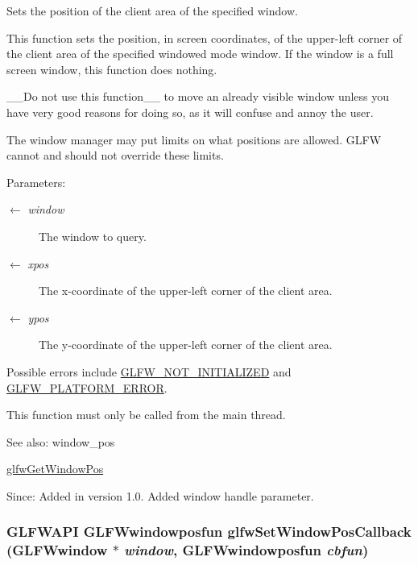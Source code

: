 Sets the position of the client area of the specified window. 

This function sets the position, in screen coordinates, of the upper-left corner of the client area of the specified windowed mode window. If the window is a full screen window, this function does nothing.

\_\-\_\-Do not use this function\_\-\_\- to move an already visible window unless you have very good reasons for doing so, as it will confuse and annoy the user.

The window manager may put limits on what positions are allowed. GLFW cannot and should not override these limits.

\begin{Desc}
\item[Parameters:]
\begin{description}
\item[\mbox{$\leftarrow$} {\em window}]The window to query. \item[\mbox{$\leftarrow$} {\em xpos}]The x-coordinate of the upper-left corner of the client area. \item[\mbox{$\leftarrow$} {\em ypos}]The y-coordinate of the upper-left corner of the client area.\end{description}
\end{Desc}
Possible errors include \hyperlink{group__errors_g2374ee02c177f12e1fa76ff3ed15e14a}{GLFW\_\-NOT\_\-INITIALIZED} and \hyperlink{group__errors_gd44162d78100ea5e87cdd38426b8c7a1}{GLFW\_\-PLATFORM\_\-ERROR}.

This function must only be called from the main thread.

\begin{Desc}
\item[See also:]window\_\-pos 

\hyperlink{group__window_g0076a8591ef7494d359730cf2250b45b}{glfwGetWindowPos}\end{Desc}
\begin{Desc}
\item[Since:]Added in version 1.0.  Added window handle parameter. \end{Desc}
\hypertarget{group__window_gea610899c4cb070dcd655c6de1fe1d2c}{
\subsubsection[glfwSetWindowPosCallback]{\setlength{\rightskip}{0pt plus 5cm}GLFWAPI {\bf GLFWwindowposfun} glfwSetWindowPosCallback ({\bf GLFWwindow} $\ast$ {\em window}, \/  {\bf GLFWwindowposfun} {\em cbfun})}}
\label{group__window_gea610899c4cb070dcd655c6de1fe1d2c}



